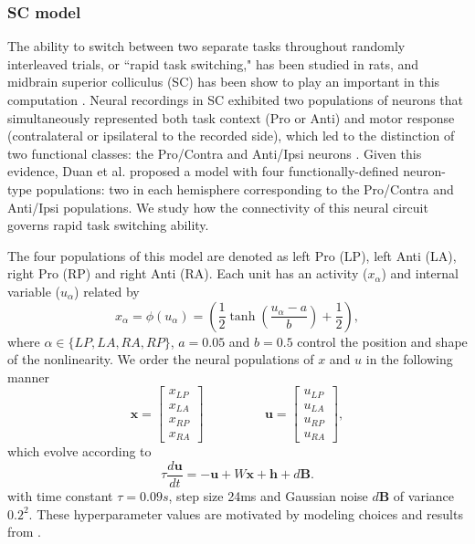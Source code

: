 \documentclass[11pt]{article}
\begin{document}
\subsubsection{SC model} \label{methods_sc_model}
The ability to switch between two separate tasks throughout randomly interleaved trials, or ``rapid task switching," has been studied in rats, and midbrain superior colliculus (SC) has been show to play an important in this computation \cite{duan2015requirement}.
Neural recordings in SC exhibited two populations of neurons that simultaneously represented both task context (Pro or Anti) and motor response (contralateral or ipsilateral to the recorded side), which led to the distinction of two functional classes: the Pro/Contra and Anti/Ipsi neurons \cite{duan2018collicular}.
Given this evidence, Duan et al. proposed a model with four functionally-defined neuron-type populations: two in each hemisphere corresponding to the Pro/Contra and Anti/Ipsi populations.  
We study how the connectivity of this neural circuit governs rapid task switching ability.

The four populations of this model are denoted as left Pro (LP), left Anti (LA), right Pro (RP) and right Anti (RA).  
Each unit has an activity ($x_\alpha$) and internal variable ($u_\alpha$) related by
\begin{equation}
x_\alpha = \phi(u_\alpha) = \left(\frac{1}{2}\tanh\left(\frac{u_\alpha - a}{b}\right)+ \frac{1}{2} \right),
\end{equation}
where $\alpha \in \{LP, LA, RA, RP\}$, $a = 0.05$ and $b = 0.5$ control the position and shape of the nonlinearity.
We order the neural populations of $x$ and $u$ in the following manner
\begin{equation}
\mathbf{x} = \begin{bmatrix} x_{LP} \\ x_{LA} \\ x_{RP} \\ x_{RA} \end{bmatrix} \hspace{2cm} \mathbf{u} = \begin{bmatrix} u_{LP} \\ u_{LA} \\ u_{RP} \\ u_{RA} \end{bmatrix},
\end{equation}
which evolve according to
\begin{equation}
\tau \frac{d\mathbf{u}}{dt} = -\mathbf{u} + W\mathbf{x} + \mathbf{h} + d\mathbf{B}.
\end{equation}
with time constant $\tau = 0.09s$, step size 24ms and Gaussian noise $d\mathbf{B}$ of variance $0.2^2$.
These hyperparameter values are motivated by modeling choices and results from \cite{duan2018collicular}.
\end{document}
